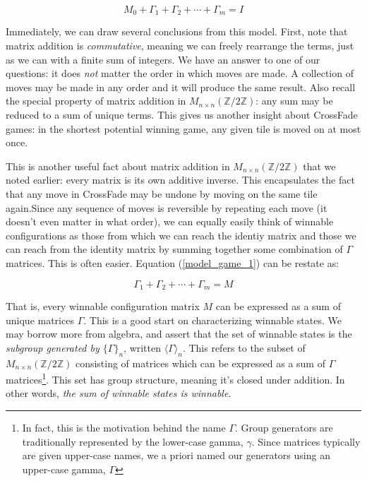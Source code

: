 \documentclass{article}[12pt]
\newcommand{\group}[1]{M_{#1 \times #1}(\mathbb{Z}/2\mathbb{Z})}
\newcommand{\subgroup}[1]{\langle\Gamma\rangle_{#1}}
\newcommand{\refx}[1]{(\ref{#1})}
\begin{document}
\begin{equation}
\label{model_game_1}
M_0 + \Gamma_1 + \Gamma_2 + \cdots + \Gamma_m = I
\end{equation}

Immediately, we can draw several conclusions from this model.  First, note that matrix addition is \emph{commutative}, meaning we can freely rearrange the terms, just as we can with a finite sum of integers.  We have an answer to one of our questions: it does \emph{not} matter the order in which moves are made.  A collection of moves may be made in any order and it will produce the same result.  Also recall the special property of matrix addition in $\group{n}$: any sum may be reduced to a sum of unique terms.  This gives us another insight about CrossFade games: in the shortest potential winning game, any given tile is moved on at most once.

This is another useful fact about matrix addition in $\group{n}$ that we noted earlier: every matrix is its own additive inverse.  This encapsulates the fact that any move in CrossFade may be undone by moving on the same tile again.Since any sequence of moves is reversible by repeating each move (it doesn't even matter in what order), we can equally easily think of winnable configurations as those from which we can reach the identiy matrix and those we can reach from the identity matrix by summing together some combination of $\Gamma$ matrices.  This is often easier.  Equation \refx{model_game_1} can be restate as:

\begin{equation}
\label{model_game_2}
\Gamma_1 + \Gamma_2 + \cdots + \Gamma_m = M
\end{equation}

That is, every winnable configuration matrix $M$ can be expressed as a sum of unique matrices $\Gamma$.  This is a good start on characterizing winnable states.  We may borrow more from algebra, and assert that the set of winnable states is the \emph{subgroup generated by $\{\Gamma\}_n$}, written $\subgroup{n}$.  This refers to the subset of $\group{n}$ consisting of matrices which can be expressed as a sum of $\Gamma$ matrices\footnote{In fact, this is the motivation behind the name $\Gamma$.  Group generators are traditionally represented by the lower-case gamma, $\gamma$.  Since matrices typically are given upper-case names, we a priori named our generators using an upper-case gamma, $\Gamma$}.  This set has group structure, meaning it's closed under addition.  In other words, \emph{the sum of winnable states is winnable}.
\end{document}
